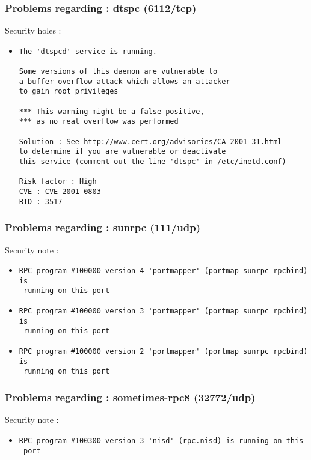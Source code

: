\documentclass{article}
\begin{document}
\subsubsection{Problems regarding : dtspc (6112/tcp)}
Security holes :\\
\begin{itemize}
\item \begin{verbatim}
The 'dtspcd' service is running.

Some versions of this daemon are vulnerable to
a buffer overflow attack which allows an attacker
to gain root privileges

*** This warning might be a false positive,
*** as no real overflow was performed

Solution : See http://www.cert.org/advisories/CA-2001-31.html
to determine if you are vulnerable or deactivate
this service (comment out the line 'dtspc' in /etc/inetd.conf)

Risk factor : High
CVE : CVE-2001-0803
BID : 3517
\end{verbatim}\end{itemize}
\subsubsection{Problems regarding : sunrpc (111/udp)}
Security note :\\
\begin{itemize}
\item \begin{verbatim}
RPC program #100000 version 4 'portmapper' (portmap sunrpc rpcbind) is
 running on this port
\end{verbatim}\item \begin{verbatim}
RPC program #100000 version 3 'portmapper' (portmap sunrpc rpcbind) is
 running on this port
\end{verbatim}\item \begin{verbatim}
RPC program #100000 version 2 'portmapper' (portmap sunrpc rpcbind) is
 running on this port
\end{verbatim}\end{itemize}
\subsubsection{Problems regarding : sometimes-rpc8 (32772/udp)}
Security note :\\
\begin{itemize}
\item \begin{verbatim}
RPC program #100300 version 3 'nisd' (rpc.nisd) is running on this
 port
\end{verbatim}\end{itemize}
\end{document}
